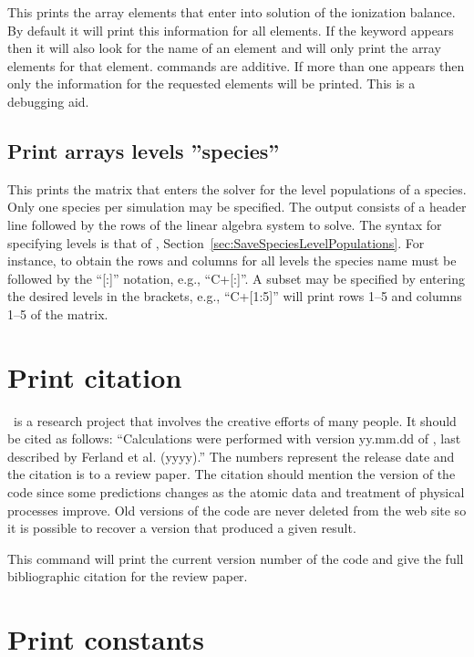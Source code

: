 This prints the array elements that enter into solution
of the ionization balance.
By default it will print this information for
all elements.
If the keyword  appears then it will also look for the
name of an element and will only print the array
elements for that element.
 commands are additive.
If more than one appears then only the information for the
requested elements will be printed.
This is a debugging aid.

\subsection{Print arrays levels ''species''}
\label{sec:PrintArraysLevels}

\par
This prints the matrix that enters the solver
for the level populations of a species.
Only one species per simulation may be specified.
The output consists of a header line followed by the rows
of the linear algebra system to solve.
The syntax for specifying levels is that of
,
Section~\ref{sec:SaveSpeciesLevelPopulations}.
For instance, to obtain the rows and columns for all levels
the species name must be followed by the ``[:]'' notation,
e.g., ``C+[:]''.
A subset may be specified by entering the desired levels
in the brackets, e.g., ``C+[1:5]'' will print rows 1--5
and columns 1--5 of the matrix.


\section{Print citation}

\Cloudy\ is a research project that involves the creative efforts of many
people.  It should be cited as follows:  ``Calculations were performed with
version yy.mm.dd of \Cloudy, last described by Ferland et al. (yyyy).''
The numbers represent the release date and the citation is to a review paper.
The citation should mention the version of the code since some predictions
changes as the atomic data and treatment of physical processes improve.
Old versions of the code are never deleted from the web site so it is
possible to recover a version that produced a given result.

This command will print the current version number of the code and give
the full bibliographic citation for the review paper.

\section{Print constants}

